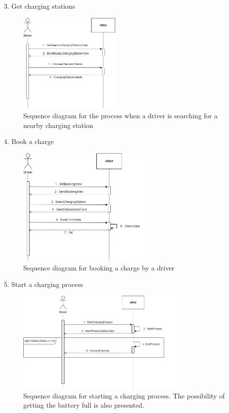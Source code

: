 \documentclass[../main.tex]{subfiles}
\begin{document}
3. Get charging stations
\begin{figure}[H]
    \centering
    \includegraphics[width=0.45\textwidth]{sequences/sd_getChargingStations.png}
    \caption{Sequence diagram for the process when a driver is searching for a nearby charging station}
    \label{fig:getstations}
\end{figure}

4. Book a charge
\begin{figure}[H]
    \centering
    \includegraphics[width=0.6\textwidth]{sequences/sd_booking.png}
    \caption{Sequence diagram for booking a charge by a driver}
    \label{fig:booking}
\end{figure}

5. Start a charging process
\begin{figure}[H]
    \centering
    \includegraphics[width=0.75\textwidth]{sequences/sd_startCharge.png}
    \caption{Sequence diagram for starting a charging process. The possibility of getting the battery full is also presented.}
    \label{fig:startCharge}
\end{figure}
\end{document}
